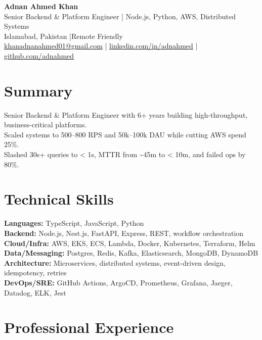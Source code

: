 \documentclass[10pt,letterpaper]{article}
\begin{document}
\small

\begin{center}
  {\Large\bfseries Adnan Ahmed Khan}\\[0.15em]
  {\normalsize Senior Backend \& Platform Engineer | Node.js, Python, AWS, Distributed Systems}\\[0.2em]
  Islamabad, Pakistan \quad|\quad Remote Friendly\\[0.2em]
  \href{mailto:khanadnanahmed01@gmail.com}{khanadnanahmed01@gmail.com}
  \quad|\quad
  \href{https://linkedin.com/in/adnahmed}{linkedin.com/in/adnahmed}
  \quad|\quad
  \href{https://github.com/adnahmed}{github.com/adnahmed}
\end{center}

\section*{Summary}
Senior Backend \& Platform Engineer with 6+ years building high-throughput, business-critical platforms.\\
Scaled systems to 500--800 RPS and 50k--100k DAU while cutting AWS spend 25\%.\\
Slashed 30s+ queries to \textless{} 1s, MTTR from \textasciitilde{}45m to \textless{} 10m, and failed ops by 80\%.

\vfill

\section*{Technical Skills}
\textbf{Languages:} TypeScript, JavaScript, Python\\
\textbf{Backend:} Node.js, Nest.js, FastAPI, Express, REST, workflow orchestration\\
\textbf{Cloud/Infra:} AWS, EKS, ECS, Lambda, Docker, Kubernetes, Terraform, Helm\\
\textbf{Data/Messaging:} Postgres, Redis, Kafka, Elasticsearch, MongoDB, DynamoDB\\
\textbf{Architecture:} Microservices, distributed systems, event-driven design, idempotency, retries\\
\textbf{DevOps/SRE:} GitHub Actions, ArgoCD, Prometheus, Grafana, Jaeger, Datadog, ELK, Jest

\vfill

\section*{Professional Experience}
\end{document}

